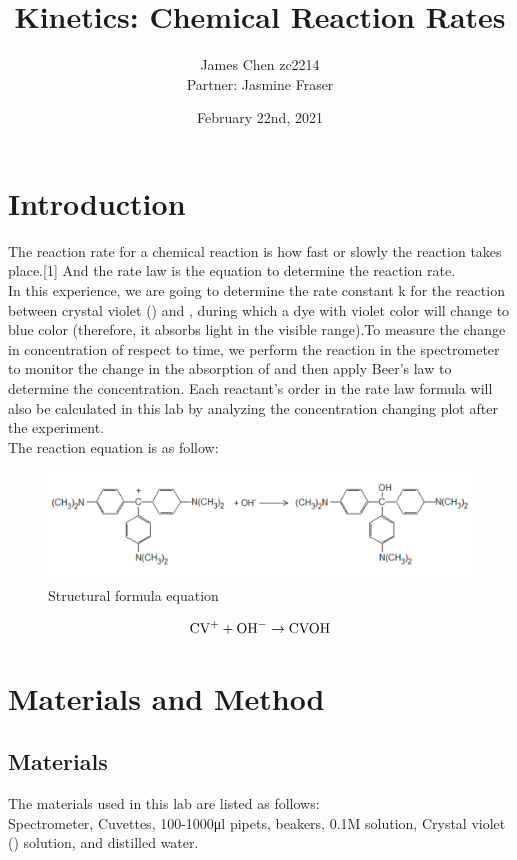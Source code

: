 \documentclass{article}
\title{Kinetics: Chemical Reaction Rates}
\author{James Chen zc2214\\Partner: Jasmine Fraser}
\date{February 22nd, 2021}
\begin{document}
\maketitle

\section{Introduction}
The reaction rate for a chemical reaction is how fast or slowly the reaction takes place.[1] And the rate law is the equation to determine the reaction rate.\\ In this experience, we are going to determine the rate constant k for the reaction between crystal violet () and , during which a dye with violet color will change to blue color (therefore, it absorbs light in the visible range).To measure the change in concentration of  respect to time, we perform the reaction in the spectrometer to monitor the change in the absorption of  and then apply Beer’s law to determine the concentration. Each reactant's order in the rate law formula will also be calculated in this lab by analyzing the concentration changing plot after the experiment.\\
The reaction equation is as follow:\\
\begin{figure}[H] 
\centering
\includegraphics[scale=0.5]{Structural formula.png}
\caption{Structural formula equation}
\label{fig:Structural formula equation}
\end{figure}
\begin{equation}
\ce{CV+} + \ce{OH-} \rightarrow \ce{CVOH}
\end{equation}


\section{Materials and Method}
\subsection{Materials}
The materials used in this lab are listed as follows:\\
Spectrometer, Cuvettes, 100-1000μl pipets, beakers, 0.1M  solution, Crystal violet () solution, and distilled water.
\end{document}
